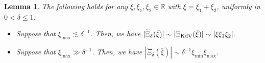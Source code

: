 \documentclass[letterpaper, 11pt,  reqno]{amsart}
\newtheorem{lemma}[theorem]{Lemma}
\newcommand{\1}{\hspace{0.5mm}\textup{I}\hspace{0.5mm}}
\newcommand{\noi}{\noindent}
\newcommand{\R}{\mathbb{R}}
\newcommand{\dl}{\delta}
\newcommand{\wt}{\widetilde}
\newcommand{\les}{\lesssim}
\newcommand{\ges}{\gtrsim}
\newcommand{\KDV}{\text{\rm KdV} }
\numberwithin{equation}{section}
\numberwithin{theorem}{section}
\begin{document}
\begin{lemma}\label{LEM:res}
The following holds 
for any $\xi, \xi_1, \xi_2 \in \R$
with $\xi = \xi_1 + \xi_2$, 
uniformly in $0 < \dl \le 1$\textup{:}

\smallskip

\begin{itemize}
\item
[\textup{(i)}]
Suppose that  $\xi_{\max} \les \dl^{-1}$.
Then, we have 
$|\wt \Xi_\dl(\bar \xi)|
\sim |\Xi_\KDV(\bar \xi)|\sim |\xi\xi_1\xi_2|$.




\medskip

\item [\textup{(ii)}]
Suppose that $ \xi_{\max} \gg \dl^{-1}$.
Then, we have 
$|\wt \Xi_\dl(\bar \xi)|
\sim    \dl^{-1} \xi_{\min}\xi_{\max}$. 


%


\end{itemize}



\end{lemma}
\end{document}
